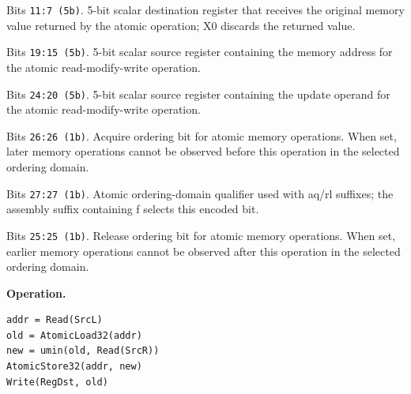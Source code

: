 \begin{description}[leftmargin=0.18\linewidth,style=nextline]
\item[\texttt{RegDst}] Bits \texttt{11:7 (5b)}. 5-bit scalar destination register that receives the original memory value returned by the atomic operation; X0 discards the returned value.
\item[\texttt{SrcL}] Bits \texttt{19:15 (5b)}. 5-bit scalar source register containing the memory address for the atomic read-modify-write operation.
\item[\texttt{SrcR}] Bits \texttt{24:20 (5b)}. 5-bit scalar source register containing the update operand for the atomic read-modify-write operation.
\item[\texttt{aq}] Bits \texttt{26:26 (1b)}. Acquire ordering bit for atomic memory operations. When set, later memory operations cannot be observed before this operation in the selected ordering domain.
\item[\texttt{far}] Bits \texttt{27:27 (1b)}. Atomic ordering-domain qualifier used with aq/rl suffixes; the assembly suffix containing f selects this encoded bit.
\item[\texttt{rl}] Bits \texttt{25:25 (1b)}. Release ordering bit for atomic memory operations. When set, earlier memory operations cannot be observed after this operation in the selected ordering domain.
\end{description}
\noindent\textbf{Operation.}\par
\begin{lstlisting}[style=ptoscalarcode]
addr = Read(SrcL)
old = AtomicLoad32(addr)
new = umin(old, Read(SrcR))
AtomicStore32(addr, new)
Write(RegDst, old)
\end{lstlisting}
\Needspace{0.08\textheight}
